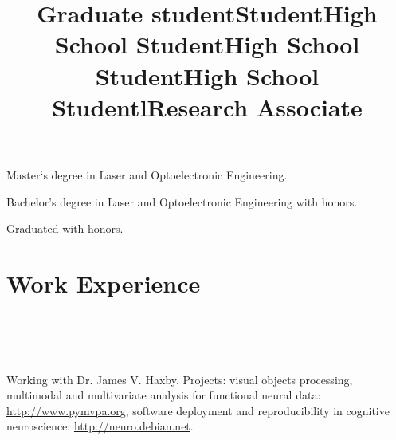 \documentclass[12pt,overlapped,line]{res}
\begin{document}
\begin{resume}
 \title{Graduate student}
 \begin{position}
  Master`s degree in Laser and Optoelectronic Engineering.
 \end{position}

 \title{Student}
 \begin{position}
  Bachelor's degree in Laser and Optoelectronic Engineering with
  honors.
 \end{position}

 \title{High School Student}
 \begin{position}
  Graduated with honors.
 \end{position}

 \title{High School Student}
 \begin{position}
 \vspace{-2.5em}
 \end{position}

 \title{High School Student}
 \begin{position}
 \end{position}

\vspace{-3em}
 \section{Work Experience}
 \begin{format}
   \title{l}\\
   \\
   \body\\
 \end{format}


\title{Research Associate}
\begin{position}
  Working with Dr. James V. Haxby.  Projects: visual objects
  processing, multimodal and multivariate analysis for functional
  neural data: \url{http://www.pymvpa.org}, software deployment and
  reproducibility in cognitive neuroscience:
  \url{http://neuro.debian.net}.
\end{position}


\end{resume}
\end{document}
